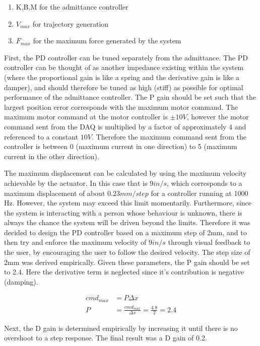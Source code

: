 \documentclass[12pt]{report}
\begin{document}
	\begin{enumerate}
		\item K,B,M for the admittance controller
		\item $V_{max}$ for trajectory generation
		\item $F_{max}$ for the maximum force generated by the system
	\end{enumerate}
	
	
	First, the PD controller can be tuned separately from the admittance. The PD controller can be thought of as another impedance existing within the system (where the proportional gain is like a spring and the derivative gain is like a damper), and should therefore be tuned as high (stiff) as possible for optimal performance of the admittance controller. The P gain should be set such that the largest position error corresponds with the maximum motor command. The maximum motor command at the motor controller is $\pm 10V$, however the motor command sent from the DAQ is multiplied by a factor of approximately 4 and referenced to a constant $10 V$. Therefore the maximum command sent from the controller is between 0 (maximum current in one direction) to 5 (maximum current in the other direction). 
	
	The maximum displacement can be calculated by using the maximum velocity achievable by the actuator. In this case that is $9 in/s$, which corresponds to a maximum displacement of about $0.23 mm/step$ for a controller running at 1000 Hz. However, the system may exceed this limit momentarily. Furthermore, since the system is interacting with a person whose behaviour is unknown, there is always the chance the system will be driven beyond the limits. Therefore it was decided to design the PD controller based on a maximum step of 2mm, and to then try and enforce the maximum velocity of $9 in/s$ through visual feedback to the user, by encouraging the user to follow the desired velocity. The step size of 2mm was derived empirically. Given these parameters, the P gain should be set to 2.4. Here the derivative term is neglected since it's contribution is negative (damping). 
	
	\begin{align*}
		cmd_{max} &= P\Delta x \\
		P &= \frac{cmd_{max}}{\Delta x} = \frac{4.8}{2} =  2.4
	\end{align*}
	
	Next, the D gain is determined empirically by increasing it until there is no overshoot to a step response. The final result was a D gain of 0.2. 
	
\end{document}
